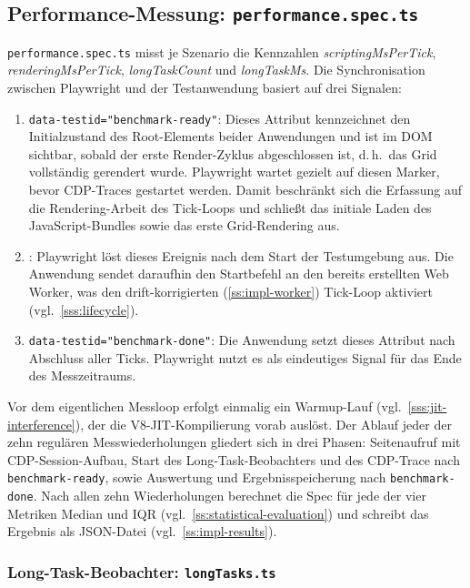 \subsection{Performance-Messung: \texttt{performance.spec.ts}}
\label{ss:impl-performance-spec}

\texttt{performance.spec.ts} misst je Szenario die Kennzahlen \textit{scriptingMsPerTick}, \textit{renderingMsPerTick}, \textit{longTaskCount} und \textit{longTaskMs}. Die Synchronisation zwischen Playwright und der Testanwendung basiert auf drei Signalen:

\begin{enumerate}
 \item \texttt{data-testid="benchmark-ready"}: Dieses Attribut kennzeichnet den Initialzustand des Root-Elements beider Anwendungen und ist im DOM sichtbar, sobald der erste Render-Zyklus abgeschlossen ist, d.\,h.\ das Grid vollständig gerendert wurde. Playwright wartet gezielt auf diesen Marker, bevor CDP-Traces gestartet werden. Damit beschränkt sich die Erfassung auf die Rendering-Arbeit des Tick-Loops und schließt das initiale Laden des JavaScript-Bundles sowie das erste Grid-Rendering aus.
 \item {}: Playwright löst dieses Ereignis nach dem Start der Testumgebung aus. Die Anwendung sendet daraufhin den Startbefehl an den bereits erstellten Web Worker, was den drift-korrigierten (\cref{ss:impl-worker}) Tick-Loop aktiviert (vgl.~\cref{sss:lifecycle}).
 \item \texttt{data-testid="benchmark-done"}: Die Anwendung setzt dieses Attribut nach Abschluss aller Ticks. Playwright nutzt es als eindeutiges Signal für das Ende des Messzeitraums.
\end{enumerate}
Vor dem eigentlichen Messloop erfolgt einmalig ein Warmup-Lauf (vgl.~\cref{sss:jit-interference}), der die V8-JIT-Kompilierung vorab auslöst. Der Ablauf jeder der zehn regulären Messwiederholungen gliedert sich in drei Phasen: Seitenaufruf mit CDP-Session-Aufbau, Start des Long-Task-Beobachters und des CDP-Trace nach \texttt{benchmark-ready}, sowie Auswertung und Ergebnisspeicherung nach \texttt{benchmark-done}. Nach allen zehn Wiederholungen berechnet die Spec für jede der vier Metriken Median und IQR (vgl.~\cref{ss:statistical-evaluation}) und schreibt das Ergebnis als JSON-Datei (vgl.~\cref{ss:impl-results}).

\subsubsection{Long-Task-Beobachter: \texttt{longTasks.ts}}
\label{sss:impl-longtasks}

